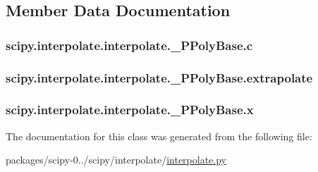 \subsection{Member Data Documentation}
\hypertarget{classscipy_1_1interpolate_1_1interpolate_1_1__PPolyBase_a63738e69e006c8810b6f7c0b7f5166a7}{}
\subsubsection[{c}]{\setlength{\rightskip}{0pt plus 5cm}scipy.\+interpolate.\+interpolate.\+\_\+\+P\+Poly\+Base.\+c}\label{classscipy_1_1interpolate_1_1interpolate_1_1__PPolyBase_a63738e69e006c8810b6f7c0b7f5166a7}
\hypertarget{classscipy_1_1interpolate_1_1interpolate_1_1__PPolyBase_ae956a6a4fe79cae71fa2d89c4a85e821}{}
\subsubsection[{extrapolate}]{\setlength{\rightskip}{0pt plus 5cm}scipy.\+interpolate.\+interpolate.\+\_\+\+P\+Poly\+Base.\+extrapolate}\label{classscipy_1_1interpolate_1_1interpolate_1_1__PPolyBase_ae956a6a4fe79cae71fa2d89c4a85e821}
\hypertarget{classscipy_1_1interpolate_1_1interpolate_1_1__PPolyBase_a55ad7595d1d8cf0d01ac327bb280c781}{}
\subsubsection[{x}]{\setlength{\rightskip}{0pt plus 5cm}scipy.\+interpolate.\+interpolate.\+\_\+\+P\+Poly\+Base.\+x}\label{classscipy_1_1interpolate_1_1interpolate_1_1__PPolyBase_a55ad7595d1d8cf0d01ac327bb280c781}


The documentation for this class was generated from the following file\+:\begin{DoxyCompactItemize}
\item 
packages/scipy-\/0../scipy/interpolate/\hyperlink{interpolate_8py}{interpolate.\+py}\end{DoxyCompactItemize}
